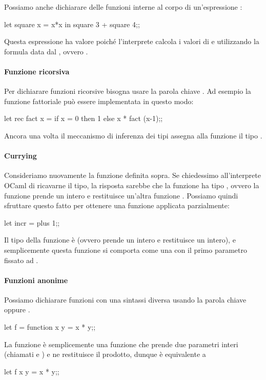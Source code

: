 Possiamo anche dichiarare delle funzioni interne al corpo di un'espressione :
\begin{OCaml}
    let square x = x*x 
        in square 3 + square 4;;
\end{OCaml}
Questa espressione ha valore  poiché l'interprete calcola i valori di  e  utilizzando la formula data dal , ovvero .

\paragraph{Funzione ricorsiva} Per dichiarare funzioni ricorsive bisogna usare la parola chiave . Ad esempio la funzione fattoriale può essere implementata in questo modo:
\begin{OCaml}
    let rec fact x = 
        if x = 0 
            then 1
            else x * fact (x-1);;
\end{OCaml}
Ancora una volta il meccanismo di inferenza dei tipi assegna alla funzione  il tipo .

\paragraph{Currying} Consideriamo nuovamente la funzione  definita sopra. Se chiedessimo all'interprete OCaml di ricavarne il tipo, la risposta sarebbe che la funzione  ha tipo , ovvero la funzione prende un intero e restituisce un'altra funzione . Possiamo quindi sfruttare questo fatto per ottenere una funzione applicata parzialmente:
\begin{OCaml}
    let incr = plus 1;;
\end{OCaml}
Il tipo della funzione  è  (ovvero prende un intero e restituisce un intero), e semplicemente questa funzione si comporta come una  con il primo parametro fissato ad .

\paragraph{Funzioni anonime}
Possiamo dichiarare funzioni con una sintassi diversa usando la parola chiave  oppure .
\begin{OCaml}
    let f = 
        function x y = x * y;;
\end{OCaml}
La funzione  è semplicemente una funzione che prende due parametri interi (chiamati  e ) e ne restituisce il prodotto, dunque è equivalente a
\begin{OCaml}
    let f x y = x * y;;
\end{OCaml}

